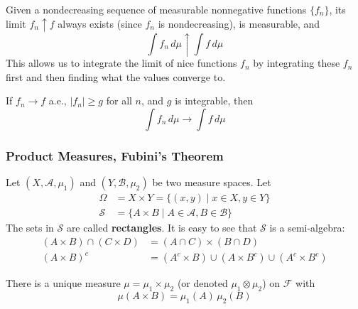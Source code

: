\documentclass{article}
\begin{document}
      \begin{theorem}
        Given a nondecreasing sequence of measurable nonnegative functions $\{f_n\}$, its limit $f_n \uparrow f$ always exists (since $f_n$ is nondecreasing), is measurable, and 
        \begin{equation}
          \int f_n \, d\mu \uparrow \int f \, d\mu
        \end{equation}
        This allows us to integrate the limit of nice functions $f_n$ by integrating these $f_n$ first and then finding what the values converge to. 
      \end{theorem}

      \begin{theorem}
        If $f_n \rightarrow f$ a.e., $|f_n| \geq g$ for all $n$, and $g$ is integrable, then 
        \begin{equation}
          \int f_n \,d\mu \rightarrow \int f\, d\mu
        \end{equation}
      \end{theorem}

    \subsubsection{Product Measures, Fubini's Theorem}

      Let $(X, \mathcal{A}, \mu_1)$ and $(Y, \mathcal{B}, \mu_2)$ be two measure spaces. Let 
      \begin{align*}
        \Omega & = X \times Y = \{(x, y) \mid x \in X, y \in Y\} \\
        \mathcal{S} & = \{A \times B \mid A \in \mathcal{A}, B \in \mathcal{B}\}
      \end{align*}
      The sets in $\mathcal{S}$ are called \textbf{rectangles}. It is easy to see that $\mathcal{S}$ is a semi-algebra: 
      \begin{align*}
        (A \times B) \cap (C \times D) & = (A \cap C) \times (B \cap D) \\
        (A \times B)^c & = (A^c \times B) \cup (A \times B^c) \cup (A^c \times B^c) 
      \end{align*}

      \begin{theorem}
        There is a unique measure $\mu = \mu_1 \times \mu_2$ (or denoted $\mu_1 \otimes \mu_2$) on $\mathcal{F}$ with 
        \begin{equation}
          \mu(A \times B) = \mu_1 (A) \, \mu_2 (B)
        \end{equation}
      \end{theorem}
\end{document}
